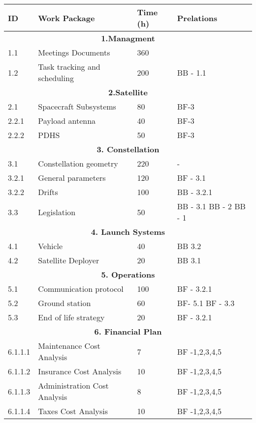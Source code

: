 \begin{longtable}{ | p{1.3cm} | p{7cm} | p{3cm} | p{3.5cm} |}
\hline

\textbf{ID }& \textbf{Work Package} & \textbf{Time (h)} & \textbf{Prelations} \\ \hline
\multicolumn{4}{|c|}{\textbf{1.Managment}} \\ \hline
1.1 & Meetings Documents & 360 &   \\ \hline
1.2 & Task tracking and scheduling & 200 & BB - 1.1 \\ \hline
\multicolumn{4}{|c|}{\textbf{2.Satellite}} \\ \hline
2.1 & Spacecraft Subsystems & 80 & BF-3 \\ \hline
2.2.1 & Payload antenna & 40 & BF-3 \\ \hline
2.2.2 & PDHS & 50 & BF-3 \\ \hline
\multicolumn{4}{|c|}{\textbf{3. Constellation}} \\ \hline
3.1 & Constellation geometry & 220 & - \\ \hline
3.2.1 & General parameters & 120 & BF - 3.1 \\ \hline
3.2.2 & Drifts & 100 & BB - 3.2.1 \\ \hline
3.3 & Legislation & 50 & BB - 3.1 \newline
BB - 2 \newline 
BB - 1 \\ \hline
\multicolumn{4}{|c|}{\textbf{4. Launch Systems}} \\ \hline
4.1 & Vehicle & 40 & BB 3.2 \\ \hline
4.2 & Satellite Deployer & 20 & BB 3.1  \\ \hline
\multicolumn{4}{|c|}{\textbf{5. Operations}} \\ \hline
5.1 & Communication protocol & 100 & BF - 3.2.1 \\ \hline
5.2 & Ground station & 60 & BF- 5.1 \newline BF - 3.3 \\ \hline
5.3 & End of life strategy & 20 & BF - 3.2.1 \\
\hline
\multicolumn{4}{|c|}{\textbf{6. Financial Plan}} \\ \hline
6.1.1.1 & Maintenance Cost Analysis & 7 & BF -1,2,3,4,5 \\ \hline
6.1.1.2 & Insurance Cost Analysis & 10 & BF -1,2,3,4,5  \\ \hline
6.1.1.3 & Administration Cost Analysis & 8 & BF -1,2,3,4,5 \\ \hline
6.1.1.4 & Taxes Cost Analysis  & 10 & BF -1,2,3,4,5  \\ \hline

\end{longtable}
